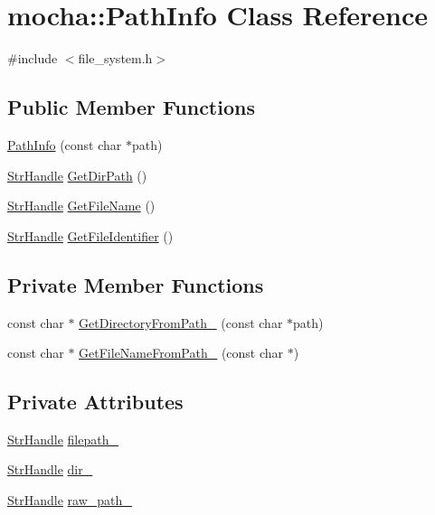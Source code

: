 \hypertarget{classmocha_1_1_path_info}{
\section{mocha::PathInfo Class Reference}
\label{classmocha_1_1_path_info}
}


{\ttfamily \#include $<$file\_\-system.h$>$}

\subsection*{Public Member Functions}
\begin{DoxyCompactItemize}
\item 
\hyperlink{classmocha_1_1_path_info_aa618f4dc5d72b3be807ddb598d6d01fe}{PathInfo} (const char $\ast$path)
\item 
\hyperlink{classmocha_1_1_array_handle}{StrHandle} \hyperlink{classmocha_1_1_path_info_a4443db590e0bf37ff5930bfdfe5166c3}{GetDirPath} ()
\item 
\hyperlink{classmocha_1_1_array_handle}{StrHandle} \hyperlink{classmocha_1_1_path_info_af18942d388c6fbf70dbd438a2db9a44b}{GetFileName} ()
\item 
\hyperlink{classmocha_1_1_array_handle}{StrHandle} \hyperlink{classmocha_1_1_path_info_a2d6a0e042742432489641f14919ccf99}{GetFileIdentifier} ()
\end{DoxyCompactItemize}
\subsection*{Private Member Functions}
\begin{DoxyCompactItemize}
\item 
const char $\ast$ \hyperlink{classmocha_1_1_path_info_aabc249449a024163119808b5b0d8e747}{GetDirectoryFromPath\_\-} (const char $\ast$path)
\item 
const char $\ast$ \hyperlink{classmocha_1_1_path_info_a42920e2cd8071019b1731ebd52aa5217}{GetFileNameFromPath\_\-} (const char $\ast$)
\end{DoxyCompactItemize}
\subsection*{Private Attributes}
\begin{DoxyCompactItemize}
\item 
\hyperlink{classmocha_1_1_array_handle}{StrHandle} \hyperlink{classmocha_1_1_path_info_a649070330e73267fff58e656ddcbbec6}{filepath\_\-}
\item 
\hyperlink{classmocha_1_1_array_handle}{StrHandle} \hyperlink{classmocha_1_1_path_info_a49b9b48a15ccf1dadc9d97d5530caddf}{dir\_\-}
\item 
\hyperlink{classmocha_1_1_array_handle}{StrHandle} \hyperlink{classmocha_1_1_path_info_afb72b77fb1aa4d7048e6885623246a8d}{raw\_\-path\_\-}
\end{DoxyCompactItemize}


